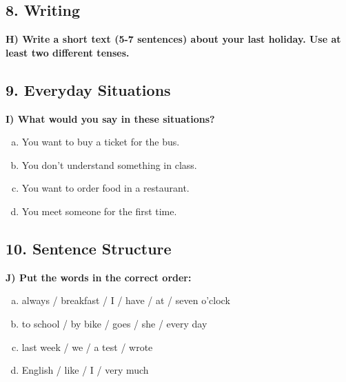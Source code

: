 \subsection*{8. Writing}
\textbf{H) Write a short text (5-7 sentences) about your last holiday. Use at least two different tenses.}

\subsection*{9. Everyday Situations}
\textbf{I) What would you say in these situations?}
\begin{enumerate}[a)]
    \item You want to buy a ticket for the bus.
    \item You don’t understand something in class.
    \item You want to order food in a restaurant.
    \item You meet someone for the first time.
\end{enumerate}

\subsection*{10. Sentence Structure}
\textbf{J) Put the words in the correct order:}
\begin{enumerate}[a)]
    \item always / breakfast / I / have / at / seven o’clock
    \item to school / by bike / goes / she / every day
    \item last week / we / a test / wrote
    \item English / like / I / very much
\end{enumerate}
